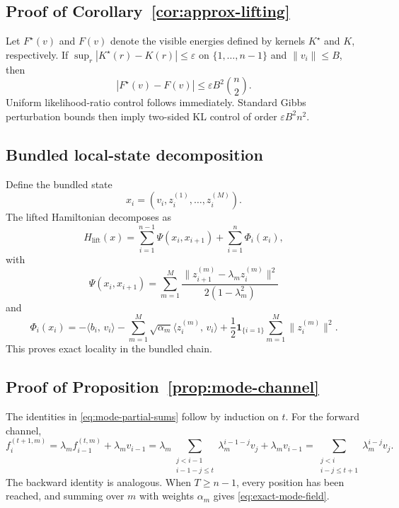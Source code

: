 \documentclass[11pt]{article}
\theoremstyle{definition}
\newcommand{\ip}[2]{\langle #1,\, #2 \rangle}
\begin{document}
\subsection*{Proof of Corollary~\ref{cor:approx-lifting}}

Let \(F^\star(v)\) and \(F(v)\) denote the visible energies defined by kernels \(K^\star\) and \(K\), respectively. If \(\sup_r|K^\star(r)-K(r)|\le\varepsilon\) on \(\{1,\dots,n-1\}\) and \(\|v_i\|\le B\), then
\begin{equation}
|F^\star(v)-F(v)|
\le
\varepsilon B^2 \binom{n}{2}.
\end{equation}
Uniform likelihood-ratio control follows immediately. Standard Gibbs perturbation bounds then imply two-sided KL control of order \(\varepsilon B^2 n^2\).

\subsection*{Bundled local-state decomposition}

Define the bundled state
\[
x_i=(v_i,z_i^{(1)},\dots,z_i^{(M)}).
\]
The lifted Hamiltonian decomposes as
\begin{equation}
H_{\mathrm{lift}}(x)
=
\sum_{i=1}^{n-1}\Psi(x_i,x_{i+1})+\sum_{i=1}^{n}\Phi_i(x_i),
\end{equation}
with
\begin{equation}
\Psi(x_i,x_{i+1})
=
\sum_{m=1}^{M}
\frac{\|z_{i+1}^{(m)}-\lambda_m z_i^{(m)}\|^2}{2(1-\lambda_m^2)}
\end{equation}
and
\begin{equation}
\Phi_i(x_i)
=
-\ip{b_i}{v_i}
-\sum_{m=1}^{M}\sqrt{\alpha_m}\ip{z_i^{(m)}}{v_i}
+\frac12\mathbf 1_{\{i=1\}}\sum_{m=1}^{M}\|z_i^{(m)}\|^2.
\end{equation}
This proves exact locality in the bundled chain.

\subsection*{Proof of Proposition~\ref{prop:mode-channel}}

The identities in \eqref{eq:mode-partial-sums} follow by induction on \(t\). For the forward channel,
\[
f_i^{(t+1,m)}
=
\lambda_m f_{i-1}^{(t,m)}+\lambda_m v_{i-1}
=
\lambda_m\sum_{\substack{j<i-1\\ i-1-j\le t}}\lambda_m^{i-1-j}v_j+\lambda_m v_{i-1}
=
\sum_{\substack{j<i\\ i-j\le t+1}}\lambda_m^{i-j}v_j.
\]
The backward identity is analogous. When \(T\ge n-1\), every position has been reached, and summing over \(m\) with weights \(\alpha_m\) gives \eqref{eq:exact-mode-field}.
\end{document}
